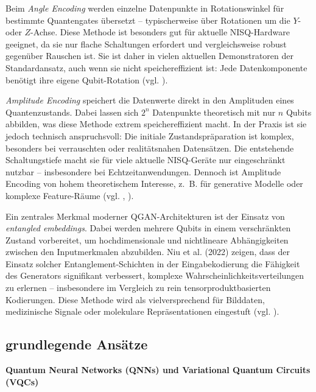 Beim \textit{Angle Encoding} werden einzelne Datenpunkte in Rotationswinkel für bestimmte Quantengates übersetzt – typischerweise über Rotationen um die $Y$- oder $Z$-Achse. Diese Methode ist besonders gut für aktuelle NISQ-Hardware geeignet, da sie nur flache Schaltungen erfordert und vergleichsweise robust gegenüber Rauschen ist. Sie ist daher in vielen aktuellen Demonstratoren der Standardansatz, auch wenn sie nicht speichereffizient ist: Jede Datenkomponente benötigt ihre eigene Qubit-Rotation (vgl. \cite{schuld_introduction_2015, bsiQuantumMachineLearning2025}).



\textit{Amplitude Encoding} speichert die Datenwerte direkt in den Amplituden eines Quantenzustands. Dabei lassen sich $2^n$ Datenpunkte theoretisch mit nur $n$ Qubits abbilden, was diese Methode extrem speichereffizient macht. In der Praxis ist sie jedoch technisch anspruchsvoll: Die initiale Zustandspräparation ist komplex, besonders bei verrauschten oder realitätsnahen Datensätzen. Die entstehende Schaltungstiefe macht sie für viele aktuelle NISQ-Geräte nur eingeschränkt nutzbar – insbesondere bei Echtzeitanwendungen. Dennoch ist Amplitude Encoding von hohem theoretischem Interesse, z.~B. für generative Modelle oder komplexe Feature-Räume (vgl. \cite{schuld_introduction_2015}, \cite{zoufal_quantum_2019}).



Ein zentrales Merkmal moderner QGAN-Architekturen ist der Einsatz von \textit{entangled embeddings}. Dabei werden mehrere Qubits in einem verschränkten Zustand vorbereitet, um hochdimensionale und nichtlineare Abhängigkeiten zwischen den Inputmerkmalen abzubilden. Niu et al. (2022) zeigen, dass der Einsatz solcher Entanglement-Schichten in der Eingabekodierung die Fähigkeit des Generators signifikant verbessert, komplexe Wahrscheinlichkeitsverteilungen zu erlernen – insbesondere im Vergleich zu rein tensorproduktbasierten Kodierungen. Diese Methode wird als vielversprechend für Bilddaten, medizinische Signale oder molekulare Repräsentationen eingestuft (vgl. \cite{niu_entangling_2022}).


\subsection{grundlegende Ansätze}  
\textbf{Quantum Neural Networks (QNNs) und Variational Quantum Circuits (VQCs)}

